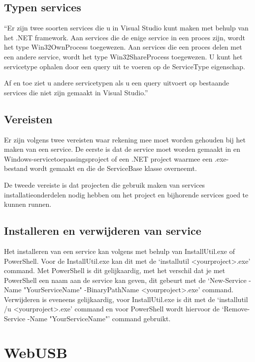 \subsection{Typen services}
``Er zijn twee soorten services die u in Visual Studio kunt maken met behulp van het .NET framework. Aan services die de enige service in een proces zijn, wordt het type Win32OwnProcess toegewezen. Aan services die een proces delen met een andere service, wordt het type Win32ShareProcess toegewezen. U kunt het servicetype ophalen door een query uit te voeren op de ServiceType eigenschap. 

Af en toe ziet u andere servicetypen als u een query uitvoert op bestaande services die niet zijn gemaakt in Visual Studio.''\autocite{DevMozService}

\subsection{Vereisten}
Er zijn volgens \textcite{DevMozService} twee vereisten waar rekening mee moet worden gehouden bij het maken van een service. De eerste is dat de service moet worden gemaakt in en Windows-servicetoepassingsproject of een .NET project waarmee een .exe-bestand wordt gemaakt en die de ServiceBase klasse overneemt. 

De tweede vereiste is dat projecten die gebruik maken van services installatieonderdelen nodig hebben om het project en bijhorende services goed te kunnen runnen. 

\subsection{Installeren en verwijderen van service}
Het installeren van een service kan volgens \textcite{DevMozServiceInstall} met behulp van InstallUtil.exe of PowerShell. Voor de InstallUtil.exe kan dit met de ‘installutil <yourproject>.exe’ command. Met PowerShell is dit gelijkaardig, met het verschil dat je met PowerShell een naam aan de service kan geven, dit gebeurt met de ‘New-Service -Name "YourServiceName" -BinaryPathName <yourproject>.exe’ command. Verwijderen is eveneens gelijkaardig, voor InstallUtil.exe is dit met de ‘installutil /u <yourproject>.exe’ command en voor PowerShell wordt hiervoor de ‘Remove-Service -Name "YourServiceName"’ command gebruikt. 





\section{WebUSB}
